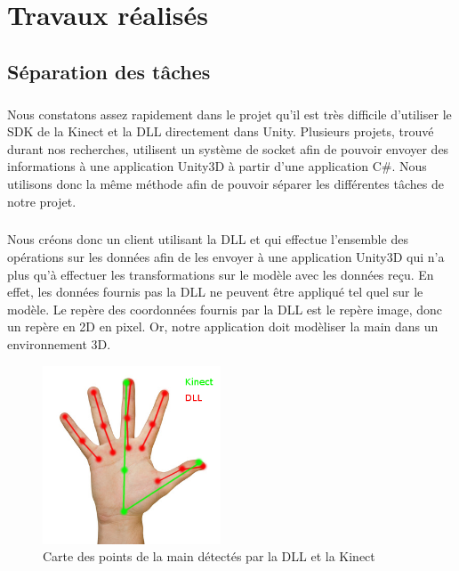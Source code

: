 \chapter{Travaux réalisés}

\section{Séparation des tâches}
\paragraph{}
Nous constatons assez rapidement dans le projet qu'il est très difficile d'utiliser
le SDK de la Kinect et la DLL directement dans Unity. Plusieurs projets, trouvé durant nos recherches, utilisent un système 
de socket afin de pouvoir envoyer des informations à une application Unity3D à partir d'une application C\#.
Nous utilisons donc la même méthode afin de pouvoir séparer les différentes tâches de notre projet.

\paragraph{}
Nous créons donc un client utilisant la DLL et qui effectue l'ensemble des opérations sur les données afin
de les envoyer à une application Unity3D qui n'a plus qu'à effectuer les transformations sur le modèle avec
les données reçu. En effet, les données fournis pas la DLL ne peuvent être appliqué tel quel sur le modèle.
Le repère des coordonnées fournis par la DLL est le repère image, donc un repère en 2D en pixel. Or, notre 
application doit modèliser la main dans un environnement 3D.


\begin{figure}[H]
  \label{carte_main}
  \begin{center}
    \includegraphics[width=200px]{images/main2.png}
    \caption{Carte des points de la main détectés par la DLL et la Kinect}
  \end{center}
\end{figure}

